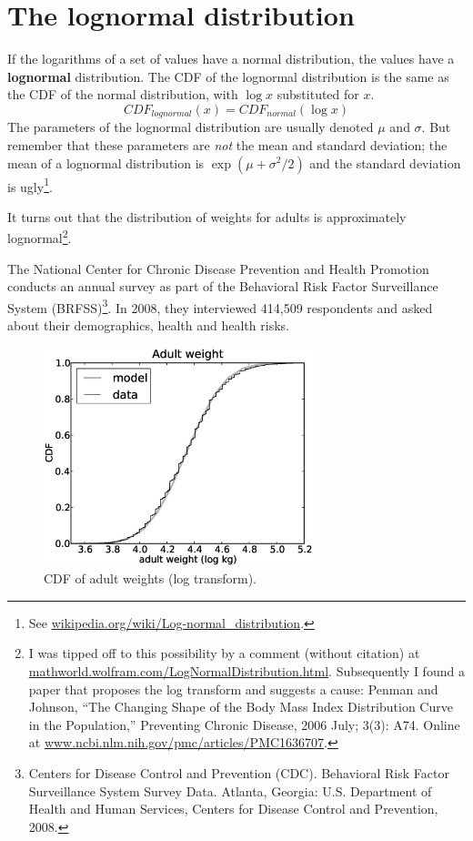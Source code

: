 \documentclass[12pt]{book}
\begin{document}
\section{The lognormal distribution}
\label{lognormal}


If the logarithms of a set of values have a normal distribution, the
values have a {\bf lognormal} distribution.  The CDF of the lognormal
distribution is the same as the CDF of the normal distribution,
with $\log x$ substituted for $x$.
%
\[ CDF_{lognormal}(x) = CDF_{normal}(\log x) \]
%
The parameters of the lognormal distribution are usually denoted $\mu$
and $\sigma$.  But remember that these parameters are {\em not} the
mean and standard deviation; the mean of a lognormal distribution is
$\exp(\mu + \sigma^2/2)$ and the standard deviation is
ugly\footnote{See \url{wikipedia.org/wiki/Log-normal_distribution}.}.


It turns out that the distribution of weights for adults is
approximately lognormal\footnote{I was tipped off to this possibility by a
  comment (without citation) at
  \url{mathworld.wolfram.com/LogNormalDistribution.html}.
  Subsequently I found a paper that proposes the log transform and
  suggests a cause: Penman and Johnson, ``The Changing Shape of the
  Body Mass Index Distribution Curve in the Population,'' Preventing
  Chronic Disease, 2006 July; 3(3): A74.  Online
  at \url{www.ncbi.nlm.nih.gov/pmc/articles/PMC1636707}.}.

The National Center for Chronic Disease
Prevention and Health Promotion conducts an annual survey as part of
the Behavioral Risk Factor Surveillance System
(BRFSS)\footnote{Centers for Disease Control and Prevention
  (CDC). Behavioral Risk Factor Surveillance System Survey
  Data. Atlanta, Georgia: U.S. Department of Health and Human
  Services, Centers for Disease Control and Prevention, 2008.}.  In
2008, they interviewed 414,509 respondents and asked about their
demographics, health and health risks.



\begin{figure}
\centerline{
\includegraphics[height=2.5in]{figs/brfss_weight_log.eps}
}
\caption{CDF of adult weights (log
  transform).}
\label{brfss_weight_log}
\end{figure}
\end{document}
